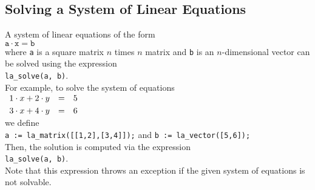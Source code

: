 \subsection{Solving a System of Linear Equations}
A system of linear equations of the form
\\[0.2cm]
\hspace*{1.3cm}
$\texttt{a} \cdot \texttt{x} = \texttt{b}$
\\[0.2cm]
where \texttt{a} is a square matrix $n$ times $n$  matrix and  \texttt{b} is an $n$-dimensional
vector can be solved using the expression
\\[0.2cm]
\hspace*{1.3cm}
\texttt{la\_solve(a, b)}.
\\[0.2cm]
For example, to solve the system of equations
\\[0.2cm]
\hspace*{1.3cm}
$
\begin{array}[c]{lcl}
  1 \cdot x + 2 \cdot y & = & 5 \\[0.1cm]
  3 \cdot x + 4 \cdot y & = & 6 
\end{array}
$
\\[0.2cm]
we define
\\[0.2cm]
\hspace*{1.3cm}
\texttt{a := la\_matrix([[1,2],[3,4]]);} \quad and \quad \texttt{b := la\_vector([5,6]);}
\\[0.2cm]
Then, the solution is computed via the expression
\\[0.2cm]
\hspace*{1.3cm}
\texttt{la\_solve(a, b)}.
\\[0.2cm]
Note that this expression throws an exception if the given system of equations is not solvable.


